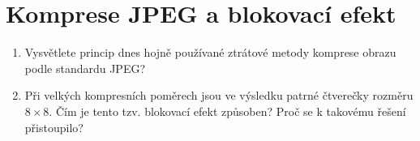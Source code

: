 \section{Komprese JPEG a blokovací efekt}
\begin{enumerate}
    \item Vysvětlete princip dnes hojně používané ztrátové metody komprese obrazu podle standardu JPEG? 
    \item Při velkých kompresních poměrech jsou ve výsledku patrné čtverečky rozměru $8 \times 8$. Čím je tento tzv. 
    blokovací efekt způsoben? Proč se k takovému řešení přistoupilo?
\end{enumerate}